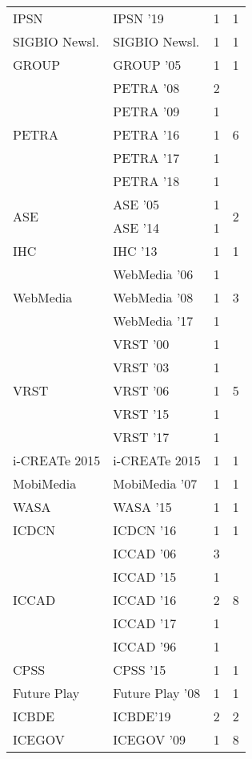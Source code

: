 \begin{table*}[t]
\begin{tabular}{llrr}
\multirow{1}{*}{IPSN } & IPSN '19 & 1 & \multirow{1}{*}{1}\\
\multirow{1}{*}{SIGBIO Newsl.} & SIGBIO Newsl. & 1 & \multirow{1}{*}{1}\\
\multirow{1}{*}{GROUP } & GROUP '05 & 1 & \multirow{1}{*}{1}\\
\multirow{5}{*}{PETRA } & PETRA '08 & 2 & \multirow{5}{*}{6}\\
& PETRA '09 & 1 &\\
& PETRA '16 & 1 &\\
& PETRA '17 & 1 &\\
& PETRA '18 & 1 &\\
\multirow{2}{*}{ASE } & ASE '05 & 1 & \multirow{2}{*}{2}\\
& ASE '14 & 1 &\\
\multirow{1}{*}{IHC } & IHC '13 & 1 & \multirow{1}{*}{1}\\
\multirow{3}{*}{WebMedia } & WebMedia '06 & 1 & \multirow{3}{*}{3}\\
& WebMedia '08 & 1 &\\
& WebMedia '17 & 1 &\\
\multirow{5}{*}{VRST } & VRST '00 & 1 & \multirow{5}{*}{5}\\
& VRST '03 & 1 &\\
& VRST '06 & 1 &\\
& VRST '15 & 1 &\\
& VRST '17 & 1 &\\
\multirow{1}{*}{i-CREATe 2015} & i-CREATe 2015 & 1 & \multirow{1}{*}{1}\\
\multirow{1}{*}{MobiMedia } & MobiMedia '07 & 1 & \multirow{1}{*}{1}\\
\multirow{1}{*}{WASA } & WASA '15 & 1 & \multirow{1}{*}{1}\\
\multirow{1}{*}{ICDCN } & ICDCN '16 & 1 & \multirow{1}{*}{1}\\
\multirow{5}{*}{ICCAD } & ICCAD '06 & 3 & \multirow{5}{*}{8}\\
& ICCAD '15 & 1 &\\
& ICCAD '16 & 2 &\\
& ICCAD '17 & 1 &\\
& ICCAD '96 & 1 &\\
\multirow{1}{*}{CPSS } & CPSS '15 & 1 & \multirow{1}{*}{1}\\
\multirow{1}{*}{Future Play } & Future Play '08 & 1 & \multirow{1}{*}{1}\\
\multirow{1}{*}{ICBDE} & ICBDE'19 & 2 & \multirow{1}{*}{2}\\
\multirow{5}{*}{ICEGOV } & ICEGOV '09 & 1 & \multirow{5}{*}{8}\\

\end{tabular}
\end{table*}
